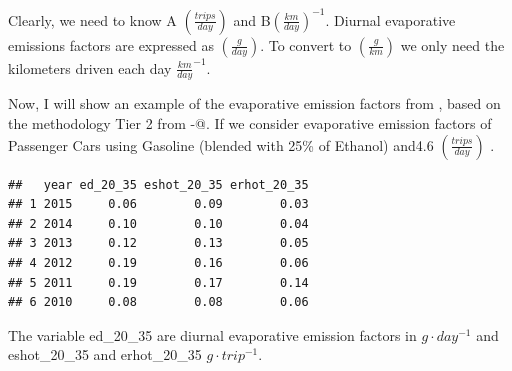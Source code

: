 \documentclass[12pt,graybox,envcountchap,sectrefs]{krantz}
\theoremstyle{definition}
\theoremstyle{definition}
\theoremstyle{definition}
\theoremstyle{remark}
\begin{document}
Clearly, we need to know A \((\frac{trips}{day})\) and
B\((\frac{km}{day})^{-1}\). Diurnal evaporative emissions factors are
expressed as \((\frac{g}{day})\). To convert to \((\frac{g}{km})\) we
only need the kilometers driven each day \(\frac{km}{day}^{-1}\).

Now, I will show an example of the evaporative emission factors from
\citet{CETESB2015}, based on the methodology Tier 2 from
-@\citet{MelliosNtziachristos2016}. If we consider evaporative emission
factors of Passenger Cars using Gasoline (blended with 25\% of Ethanol)
\citep{CETESB2015} and4.6 \((\frac{trips}{day})\) \citep{ibarrathesis}.

\begin{verbatim}
##   year ed_20_35 eshot_20_35 erhot_20_35
## 1 2015     0.06        0.09        0.03
## 2 2014     0.10        0.10        0.04
## 3 2013     0.12        0.13        0.05
## 4 2012     0.19        0.16        0.06
## 5 2011     0.19        0.17        0.14
## 6 2010     0.08        0.08        0.06
\end{verbatim}

The variable ed\_20\_35 are diurnal evaporative emission factors in
\(g \cdot day^{-1}\) and eshot\_20\_35 and erhot\_20\_35
\(g \cdot trip^{-1}\).
\end{document}
